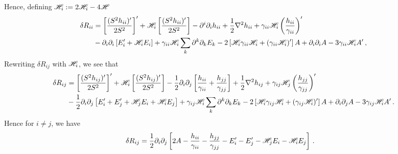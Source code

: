 \documentclass{article}
\newcommand*\scr[1]{\mathscr{#1}}
\newcommand*\p[1]{\left(#1\right)}
\newcommand*\ps[1]{\left[#1\right]}
\newcommand*\f[2]{\frac{#1}{#2}}
\begin{document}
Hence, defining ${\cal H}_i:=2\scr H_i-4\scr H$
\begin{align}
\delta R_{ii}&=\ps{\f{(S^2h_{ii})'}{2S^2}}'+{\cal H}_i\ps{\f{(S^2h_{ii})'}{2S^2}}-\partial^i\partial_ih_{ii}+\f12\nabla^2h_{ii}+\gamma_{ii}\scr H_i\p{\f{h_{ii}}{\gamma_{ii}}}'\\&-\partial_i\partial_i\ps{E_i'+{\cal H}_iE_i}+\gamma_{ii}\scr H_i\sum_k\partial^k\partial_kE_k-2\ps{{\cal H}_i\gamma_{ii}\scr H_i+(\gamma_{ii}\scr H_i)'}A+\partial_i\partial_i A-3\gamma_{ii}\scr H_i A'\,,\\
\end{align}
Rewriting $\delta R_{ij}$ with ${\cal H}_i$, we see that
\begin{align}
\notag\delta R_{ij}&=\ps{\f{(S^2h_{ij})'}{2S^2}}'+{\cal H}_i\ps{\f{(S^2h_{ij})'}{2S^2}}-\f12\partial_i\partial_j\ps{\f{h_{ii}}{\gamma_{ii}}+\f{h_{jj}}{\gamma_{jj}}}+\f12\nabla^2h_{ij}+\gamma_{ij}\scr H_j\p{\f{h_{jj}}{\gamma_{jj}}}'\\&-\f12\partial_i\partial_j\ps{E_i'+E_j'+{\cal H}_jE_i+{\cal H}_iE_j}+\gamma_{ij}\scr H_i\sum_k\partial^k\partial_kE_k-2\ps{{\cal H}_i\gamma_{ij}\scr H_i+(\gamma_{ij}\scr H_i)'}A+\partial_i\partial_j A-3\gamma_{ij}\scr H_i A'\,.
\end{align}
Hence for $i\neq j$, we have
\begin{align}
\notag\delta R_{ij}&=\f12\partial_i\partial_j \ps{2A-\f{h_{ii}}{\gamma_{ii}}-\f{h_{jj}}{\gamma_{jj}}-E_i'-E_j'-{\cal H}_jE_i-{\cal H}_iE_j}\,.
\end{align}
\end{document}
